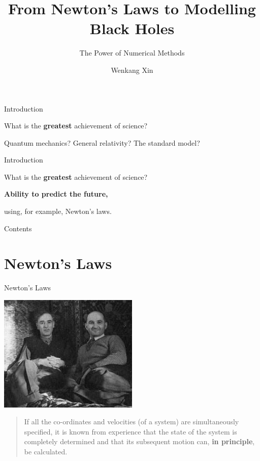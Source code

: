 \documentclass{beamer}
\title{From Newton's Laws to Modelling Black Holes}
\subtitle{The Power of Numerical Methods}
\author{Wenkang Xin}
\begin{document}
\frame{\titlepage}


\begin{frame}{Introduction}
    \begin{center}
        {\Large What is the \textbf{greatest} achievement of science?}

        \vspace{3cm}

        Quantum mechanics? General relativity? The standard model?
    \end{center}
\end{frame}


\begin{frame}{Introduction}
    \begin{center}
        {\Large What is the \textbf{greatest} achievement of science?}

        \vspace{3cm}

        \textbf{Ability to predict the future,}

        \vspace{0.5cm}

        using, for example, Newton's laws.
    \end{center}
\end{frame}


\begin{frame}{Contents}
    \tableofcontents
\end{frame}


\section{Newton's Laws}


\begin{frame}{Newton's Laws}
    \begin{center}
        \includegraphics[width=0.5\textwidth]{asset/landau_lifshitz.jpeg}
    \end{center}

    \begin{quote}
        If all the co-ordinates and velocities (of a system) are simultaneously specified, it is known from experience that the state of the system is completely determined and that its subsequent motion can, \textbf{in principle}, be calculated.
    \end{quote}

\end{frame}
\end{document}
